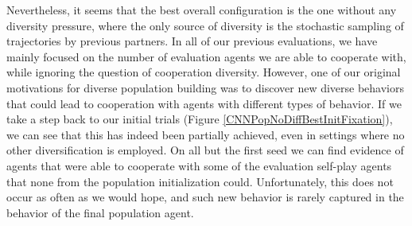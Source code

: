 Nevertheless, it seems that the best overall configuration is the one without any diversity pressure, where the only source of diversity is the stochastic sampling of trajectories by previous partners.
In all of our previous evaluations, we have mainly focused on the number of evaluation agents we are able to cooperate with, while ignoring the question of cooperation diversity.
However, one of our original motivations for diverse population building was to discover new diverse behaviors that could lead to cooperation with agents with different types of behavior.
If we take a step back to our initial trials (Figure \ref{CNNPopNoDiffBestInitFixation}), we can see that this has indeed been partially achieved, even in settings where no other diversification is employed.
On all but the first seed we can find evidence of agents that were able to cooperate with some of the evaluation self-play agents that none from the population initialization could.
Unfortunately, this does not occur as often as we would hope, and such new behavior is rarely captured in the behavior of the final population agent.  
